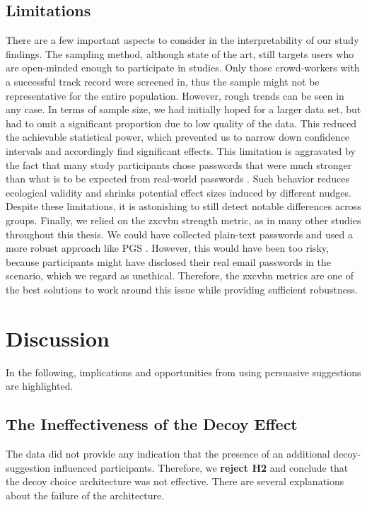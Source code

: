 \subsection{Limitations}
There are a few important aspects to consider in the interpretability of our study findings. The sampling method, although state of the art, still targets users who are open-minded enough to participate in studies. Only those crowd-workers with a successful track record were screened in, thus the sample might not be representative for the entire population. However, rough trends can be seen in any case. In terms of sample size, we had initially hoped for a larger data set, but had to omit a significant proportion due to low quality of the data. This reduced the achievable statistical power, which prevented us to narrow down confidence intervals and accordingly find significant effects. This limitation is aggravated by the fact that many study participants chose passwords that were much stronger than what is to be expected from real-world passwords \cite{Mazurek2013Measuring}. Such behavior reduces ecological validity and shrinks potential effect sizes induced by different nudges. Despite these limitations, it is astonishing to still detect notable differences across groups. Finally, we relied on the zxcvbn strength metric, as in many other studies throughout this thesis. We could have collected plain-text passwords and used a more robust approach like PGS \cite{Ur2015MeasuringRealWorldAccuracies}. However, this would have been too risky, because participants might have disclosed their real email passwords in the scenario, which we regard as unethical. Therefore, the zxcvbn metrics are one of the best solutions to work around this issue while providing sufficient robustness.

\section{Discussion}
In the following, implications and opportunities from using persuasive suggestions are highlighted. 

\subsection{The Ineffectiveness of the Decoy Effect}
The data did not provide any indication that the presence of an additional decoy-suggestion influenced participants. Therefore, we \textbf{reject H2} and conclude that the decoy choice architecture was not effective. There are several explanations about the failure of the architecture.

